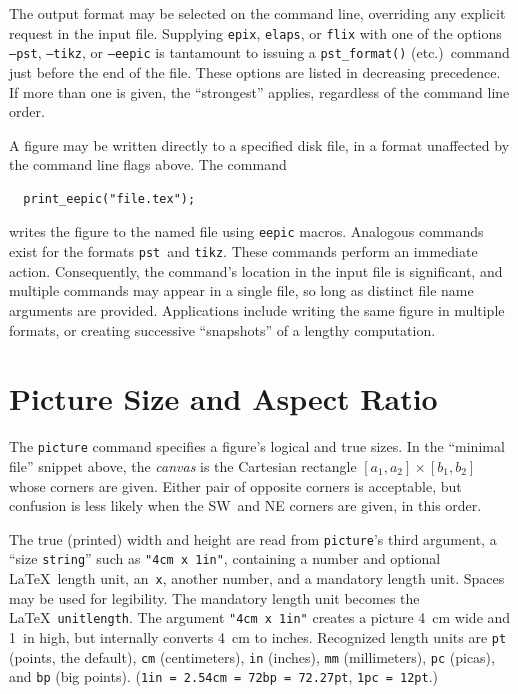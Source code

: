 \documentclass[12pt,letterpaper]{book}
\newcommand{\code}[1]{\texttt{#1}}
\newcommand{\teximath}[1]{$#1$}
\begin{document}
The output format may be selected on the command line, overriding any
explicit request in the input file. Supplying \code{epix},
\code{elaps}, or \code{flix} with one of the options \code{--pst},
\code{--tikz}, or \code{--eepic} is tantamount to issuing a
\code{pst\_format()} (etc.)\ command just before the end of the
file. These options are listed in decreasing precedence. If more than
one is given, the ``strongest'' applies, regardless of the command
line order.

A figure may be written directly to a specified disk file, in a format
unaffected by the command line flags above. The command
\begin{verbatim}
  print_eepic("file.tex");
\end{verbatim}
writes the figure to the named file using \code{eepic}
macros. Analogous commands exist for the formats \code{pst}~and
\code{tikz}. These commands perform an immediate action. Consequently,
the command's location in the input file is significant, and multiple
commands may appear in a single file, so long as distinct file name
arguments are provided. Applications include writing the same figure
in multiple formats, or creating successive ``snapshots'' of a lengthy
computation.


\section{Picture Size and Aspect Ratio}

%
%
%
The \code{picture} command specifies a figure's logical and true
sizes. In the ``minimal file'' snippet above, the \emph{canvas} is the
Cartesian rectangle \teximath{[a_1,a_2]\times[b_1,b_2]} whose corners
are given. Either pair of opposite corners is acceptable, but
confusion is less likely when the SW~and NE corners are given, in this
order.

%
The true (printed) width and height are read from \code{picture}'s
third argument, a ``size \code{string}'' such as \verb+"4cm x 1in"+,
containing a number and optional \LaTeX\ length unit, an~\code{x},
another number, and a mandatory length unit. Spaces may be used for
legibility.  The mandatory length unit becomes the \LaTeX\
\code{unitlength}.  The argument \verb+"4cm x 1in"+ creates a picture
4~cm wide and 1~in high, but internally converts 4~cm to inches.  
Recognized length units are \code{pt} (points, the default), \code{cm}
(centimeters), \code{in} (inches), \code{mm} (millimeters), \code{pc}
(picas), and \code{bp} (big points).  
(\code{1in = 2.54cm = 72bp = 72.27pt}, \code{1pc = 12pt}.)
\end{document}
